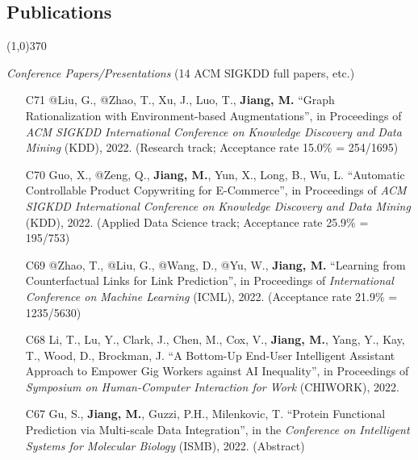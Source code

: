 \documentclass[10pt]{article}
\newenvironment{myindentpar}[1]%
{\begin{list}{}%
         {\setlength{\leftmargin}{#1}}%
         \item[]%
}
{\end{list}}
\newcounter{list}
\begin{document}
\subsection{}
\subsection{\sc Publications}
\vspace{-0.4cm} \line(1,0){370} \vspace{-0.1cm}

\begin{myindentpar}{0.00cm}

\hspace{-0.25cm}\textit{Conference Papers/Presentations} {\small (14 ACM SIGKDD full papers, etc.)}

\begin{enumerate}[leftmargin=.5cm]

\item[C71] @Liu, G., @Zhao, T., Xu, J., Luo, T., \textbf{Jiang, M.} ``Graph Rationalization with Environment-based Augmentations'', in Proceedings of \textit{ACM SIGKDD International Conference on Knowledge Discovery and Data Mining} (KDD), 2022. (Research track; Acceptance rate 15.0\% = 254/1695)

\item[C70] Guo, X., @Zeng, Q., \textbf{Jiang, M.}, Yun, X., Long, B., Wu, L. ``Automatic Controllable Product Copywriting for E-Commerce'', in Proceedings of \textit{ACM SIGKDD International Conference on Knowledge Discovery and Data Mining} (KDD), 2022. (Applied Data Science track; Acceptance rate 25.9\% = 195/753)

\item[C69] @Zhao, T., @Liu, G., @Wang, D., @Yu, W., \textbf{Jiang, M.} ``Learning from Counterfactual Links for Link Prediction'', in Proceedings of \textit{International Conference on Machine Learning} (ICML), 2022. (Acceptance rate 21.9\% = 1235/5630)

\item[C68] Li, T., Lu, Y., Clark, J., Chen, M., Cox, V., \textbf{Jiang, M.}, Yang, Y., Kay, T., Wood, D., Brockman, J. ``A Bottom-Up End-User Intelligent Assistant Approach to Empower Gig Workers against AI Inequality'', in Proceedings of \textit{Symposium on Human-Computer Interaction for Work} (CHIWORK), 2022.
		
\item[C67] Gu, S., \textbf{Jiang, M.}, Guzzi, P.H., Milenkovic, T. ``Protein Functional Prediction via Multi-scale Data Integration'', in the \textit{Conference on Intelligent Systems for Molecular Biology} (ISMB), 2022. (Abstract)


\end{enumerate}
\end{myindentpar}
\end{document}
